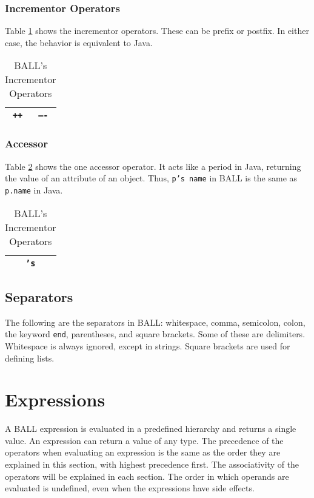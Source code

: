 \subsubsection{Incrementor Operators}
Table \ref{incremtable} shows the incrementor operators. These can be prefix or postfix. In either case, the behavior is equivalent to Java.
\begin{table}[htdp]
\begin{center}
\begin{tabular}{|c|c|}
\hline
\texttt{++} & \texttt{----}\\
\hline
\end{tabular}
\caption{BALL's Incrementor Operators}\label{incremtable}
\end{center}
\end{table}%

\subsubsection{Accessor}
Table \ref{accessortable} shows the one accessor operator. It acts like a period in Java, returning the value of an attribute of an object. Thus, \texttt{p's name} in BALL is the same as \texttt{p.name} in Java.
\begin{table}[htdp]
\begin{center}
\begin{tabular}{|c|}
\hline
\texttt{'s}\\
\hline
\end{tabular}
\caption{BALL's Incrementor Operators}\label{accessortable}
\end{center}
\end{table}%

\subsection{Separators}
The following are the separators in BALL: whitespace, comma, semicolon, colon, the keyword \texttt{end}, parentheses, and square brackets. Some of these are delimiters. Whitespace is always ignored, except in strings. Square brackets are used for defining lists.

\section{Expressions}
A BALL expression is evaluated in a predefined hierarchy and returns a single value. An expression can return a value of any type. The precedence of the operators when evaluating an expression is the same as the order they are explained in this section, with highest precedence first. The associativity of the operators will be explained in each section. The order in which operands are evaluated is undefined, even when the expressions have side effects.

